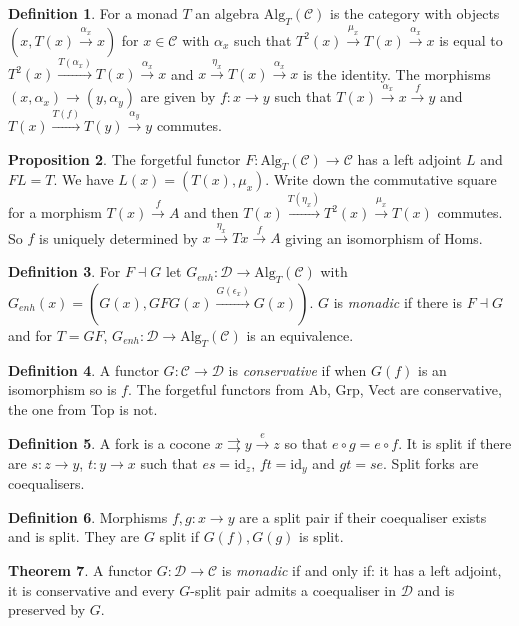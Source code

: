 \documentclass[a4paper,10pt]{article}
\theoremstyle{definition}
\newtheorem{theorem}{Theorem}
\newtheorem{definition}[theorem]{Definition}
\newtheorem{proposition}[theorem]{Proposition}
\newcommand{\C}{\mathcal{C}}
\newcommand{\D}{\mathcal{D}}
\newcommand{\id}{\mathrm{id}}
\begin{document}
\begin{definition}
    For a monad $T$ an algebra $\mathrm{Alg}_T(\C)$ is the category with objects $(x, T(x) \xrightarrow {\alpha_x} x)$ for $x \in \C$ with $\alpha_x$ such that $T^2(x) \xrightarrow{\mu_x} T(x) \xrightarrow{\alpha_x} x$ is equal to $T^2(x) \xrightarrow{T(\alpha_x)} T(x) \xrightarrow{\alpha_x} x$ and $x \xrightarrow{\eta_x} T(x) \xrightarrow{\alpha_x} x$ is the identity. The morphisms $(x, \alpha_x) \rightarrow (y, \alpha_y)$ are given by $f \colon x \rightarrow y$ such that $T(x) \xrightarrow{\alpha_x} x \xrightarrow{f} y$ and $T(x) \xrightarrow{T(f)} T(y) \xrightarrow{\alpha_y} y$ commutes.
\end{definition}

\begin{proposition}
    The forgetful functor $F \colon \mathrm{Alg}_T(\C) \rightarrow \C$ has a left adjoint $L$ and $FL = T$.
    We have $L(x) = (T(x), \mu_x)$. Write down the commutative square for a morphism $T(x) \xrightarrow{f} A$ and then $T(x) \xrightarrow{T(\eta_x)} T^2(x) \xrightarrow{\mu_x} T(x)$ commutes. So $f$ is uniquely determined by $x \xrightarrow{\eta_x} Tx \xrightarrow{f} A$ giving an isomorphism of Homs.
\end{proposition}

\begin{definition}
    For $F \dashv G$ let $G_{\mathit{enh}} \colon \D \rightarrow \mathrm{Alg}_T(\C)$ with $G_{\mathit{enh}}(x) = (G(x), GFG(x) \xrightarrow{G(\epsilon_x)} G(x))$. $G$ is \emph{monadic} if there is $F \dashv G$ and for $T = GF$, $G_\mathit{enh} \colon \D \rightarrow \mathrm{Alg}_T(\C)$ is an equivalence.
\end{definition}

\begin{definition}
    A functor $G \colon \C \rightarrow \D$ is \emph{conservative} if when $G(f)$ is an isomorphism so is $f$.
    The forgetful functors from Ab, Grp, Vect are conservative, the one from Top is not.
\end{definition}

\begin{definition}
    A fork is a cocone $x \rightrightarrows y  \xrightarrow{e} z $ so that $e \circ g = e \circ f$. It is split if there are $s \colon z \rightarrow y$, $t \colon y \rightarrow x$ such that $es = \id_z$, $ft = \id_y$ and $gt = se$.
    Split forks are coequalisers.
\end{definition}

\begin{definition}
    Morphisms $f, g \colon x \rightarrow y$ are a split pair if their coequaliser exists and is split. They are $G$ split if $G(f), G(g)$ is split.
\end{definition}

\begin{theorem}
    A functor $G \colon \D \rightarrow \C$ is \emph{monadic} if and only if: it has a left adjoint, it is conservative and every $G$-split pair admits a coequaliser in $\D$ and is preserved by $G$.
\end{theorem}
\end{document}
